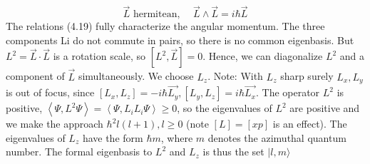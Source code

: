 \begin{equation}
    \vec{L} \text{ hermitean, } \quad \vec{L}\wedge\vec{L}=i\hbar\vec{L}
\end{equation}
The relations (4.19) fully characterize the angular momentum. The three components Li do not commute in pairs, so there is no common eigenbasis. But $L^2=\vec{L}\cdot\vec{L}$ is a rotation scale, so $[L^2, \vec{L}] = 0$. Hence, we can diagonalize $L^2$ and a component of $\vec{L}$ simultaneously. We choose $L_z$. Note: With $L_z$ sharp surely $L_x, L_y$ is out of focus, since $[L_x, L_z] = -i\hbar\vec{L_y}, [L_y, L_z] = i\hbar \vec{L_x}$. The operator $L^2$ is positive, $\left\langle\Psi, L^{2} \Psi\right\rangle=\left\langle\Psi, L_{i} L_{i} \Psi\right\rangle \geq 0$, so the eigenvalues ​​of $L^2$ are positive and we make the approach $\hbar^2l (l + 1), l ≥ 0$ (note $[L] = [xp]$ is an effect). The eigenvalues ​​of $L_z$ have the form $\hbar m$, where $m$ denotes the azimuthal quantum number. The formal eigenbasis to $L^2$ and $L_z$ is thus the set {$| l, m\rangle$}

